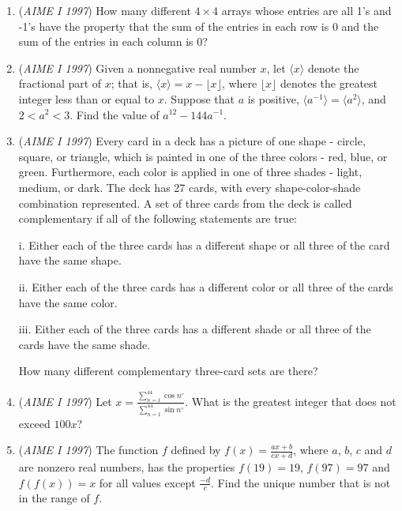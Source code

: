 \begin{enumerate}
 

	\item (\textit{AIME I 1997}) How many different $4\times 4$ arrays whose entries are all 1's and -1's have the property that the sum of the entries in each row is 0 and the sum of the entries in each column is 0?


 

	\item (\textit{AIME I 1997}) Given a nonnegative real number $x$, let $\langle x\rangle$ denote the fractional part of $x$; that is, $\langle x\rangle=x-\lfloor x\rfloor$, where $\lfloor x\rfloor$ denotes the greatest integer less than or equal to $x$. Suppose that $a$ is positive, $\langle a^{-1}\rangle=\langle a^2\rangle$, and $2<a^2<3$. Find the value of $a^{12}-144a^{-1}$.


 

	\item (\textit{AIME I 1997}) Every card in a deck has a picture of one shape - circle, square, or triangle, which is painted in one of the three colors - red, blue, or green. Furthermore, each color is applied in one of three shades - light, medium, or dark. The deck has 27 cards, with every shape-color-shade combination represented. A set of three cards from the deck is called complementary if all of the following statements are true:


 i. Either each of the three cards has a different shape or all three of the card have the same shape.


 ii. Either each of the three cards has a different color or all three of the cards have the same color.


 iii. Either each of the three cards has a different shade or all three of the cards have the same shade.


 How many different complementary three-card sets are there?


 

	\item (\textit{AIME I 1997}) Let $x=\frac{\sum\limits_{n=1}^{44} \cos n^\circ}{\sum\limits_{n=1}^{44} \sin n^\circ}$. What is the greatest integer that does not exceed $100x$?


 

	\item (\textit{AIME I 1997}) The function $f$ defined by $f(x)= \frac{ax+b}{cx+d}$, where $a$, $b$, $c$ and $d$ are nonzero real numbers, has the properties $f(19)=19$, $f(97)=97$ and $f(f(x))=x$ for all values except $\frac{-d}{c}$. Find the unique number that is not in the range of $f$.



\end{enumerate}
